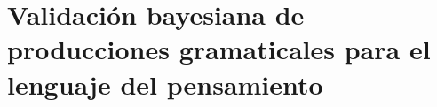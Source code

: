 

\chapter{Validación bayesiana de producciones gramaticales para el lenguaje del pensamiento}\label{chapter:PO}




